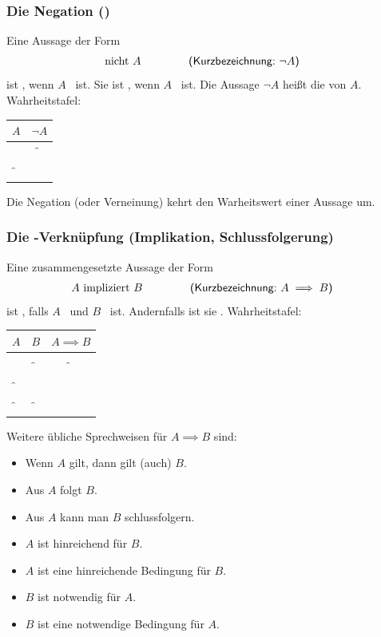 \documentclass[a4paper,12pt,oneside,openany]{book}
\newcommand{\myul}[1]{
  \uline{\phantom{#1}}\llap{\contour{white}{#1}}
}
\newcommand{\begriff}[1]{\myul{#1}}
\newcommand{\überschrift}[1]{\subsubsection{#1}}
\begin{document}
\newpage
\überschrift{Die Negation ()}

Eine Aussage der Form
\begin{align*}
	\textrm{nicht~} A & \hspace*{1.5cm}\textsf{(Kurzbezeichnung:~} \lnot A \textsf{)}
\end{align*}
ist \wahr, wenn \( A \) \falsch~ist. Sie ist \falsch, wenn \( A \) \wahr~ist.
Die Aussage \( \lnot A \) heißt die \begriff{Negation} von \( A \). Wahrheitstafel:

\begin{table}[h]
	\centering
	\begin{tabular}{c | c }
		\( A \) & \( \lnot A \) \\
		\hline
		\w      & \f            \\
		\f      & \w
	\end{tabular}
\end{table}

Die Negation (oder Verneinung) kehrt den Warheitswert einer Aussage um.

\überschrift{Die -Verknüpfung (Implikation, Schlussfolgerung)}

Eine zusammengesetzte Aussage der Form
\begin{align*}
	A \textrm{~impliziert~} B & \hspace*{1.5cm}\textsf{(Kurzbezeichnung:~} A \implies B \textsf{)}
\end{align*}
ist \falsch, falls \( A \) \wahr~und \( B \) \falsch~ist.
Andernfalls ist sie \wahr. Wahrheitstafel:

\begin{table}[h]
	\centering
	\begin{tabular}{c | c | c}
		\( A \) & \( B \) & \( A \implies B \) \\
		\hline
		\w      & \w      & \w                 \\
		\w      & \f      & \f                 \\
		\f      & \w      & \w                 \\
		\f      & \f      & \w
	\end{tabular}
\end{table}

Weitere übliche Sprechweisen für \(A \implies B\) sind:
\begin{itemize}
	\item Wenn \(A\) gilt, dann gilt (auch) \(B\).
	\item Aus \(A\) folgt \(B\).
	\item Aus \(A\) kann man \(B\) schlussfolgern. \newpage
	\item \(A\) ist hinreichend für \(B\).
	\item \(A\) ist eine hinreichende Bedingung für \(B\).
	\item \(B\) ist notwendig für \(A\).
	\item \(B\) ist eine notwendige Bedingung für \(A\).
\end{itemize}
\end{document}
